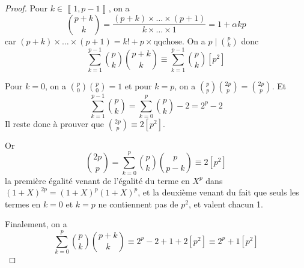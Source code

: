 \documentclass[12pt]{article}
\begin{document}
\begin{proof}
	Pour $k\in\left\llbracket 1,p-1\right\rrbracket$, on a 
	\begin{equation}
		\binom{p+k}{k}=\frac{(p+k)\times\dots\times(p+1)}{k\times\dots\times 1}=1+\alpha kp
	\end{equation}
	car $(p+k)\times\dots\times(p+1)=k!+p\times\text{qqchose}$. On a $p\mid\binom{p}{k}$ donc 
	\begin{equation}
		\sum_{k=1}^{p-1}\binom{p}{k}\binom{p+k}{k}\equiv\sum_{k=1}^{p-1}\binom{p}{k}[p^{2}]
	\end{equation}

	Pour $k=0$, on a $\binom{p}{0}\binom{p}{0}=1$ et pour $k=p$, on a $\binom{p}{p}\binom{2p}{p}=\binom{2p}{p}$. Et 
	\begin{equation}
		\sum_{k=1}^{p-1}\binom{p}{k}=\sum_{k=0}^{p}\binom{p}{k}-2=2^{p}-2
	\end{equation}
	Il reste donc à prouver que $\binom{2p}{p}\equiv 2[p^{2}]$.

	Or 
	\begin{equation}
		\binom{2p}{p}=\sum_{k=0}^{p}\binom{p}{k}\binom{p}{p-k}\equiv2[p^{2}]
	\end{equation}
	la première égalité venant de l'égalité du terme en $X^{p}$ dans $(1+X)^{2p}=(1+X)^{p}(1+X)^{p}$, et la deuxième venant du fait que seuls les termes en $k=0$ et $k=p$ ne contiennent pas de $p^{2}$, et valent chacun 1.

	Finalement, on a 
	\begin{equation}
		\boxed{
		\sum_{k=0}^{p}\binom{p}{k}\binom{p+k}{k}\equiv 2^{p}-2+1+2[p^{2}]\equiv 2^{p}+1[p^{2}]}
	\end{equation}
\end{proof}
\end{document}
